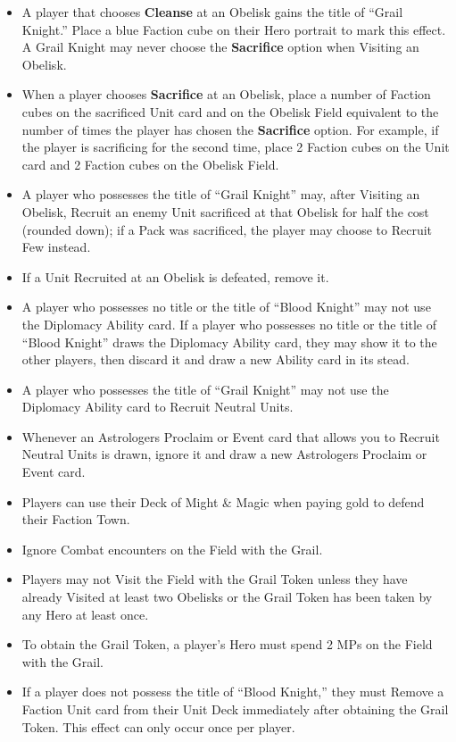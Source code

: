 \begin{multicols*}{2}
\begin{itemize}
  \item A player that chooses \textbf{Cleanse} at an Obelisk gains the title of ``\textcolor{cobalt}{Grail Knight}.'' Place a blue Faction cube on their Hero portrait to mark this effect. A \textcolor{cobalt}{Grail Knight} may never choose the \textbf{Sacrifice} option when Visiting an Obelisk.
  \item When a player chooses \textbf{Sacrifice} at an Obelisk, place a number of Faction cubes on the sacrificed Unit card and on the Obelisk Field equivalent to the number of times the player has chosen the \textbf{Sacrifice} option. For example, if the player is sacrificing for the second time, place 2 Faction cubes on the Unit card and 2 Faction cubes on the Obelisk Field.
  \item A player who possesses the title of ``\textcolor{cobalt}{Grail Knight}'' may, after Visiting an Obelisk, Recruit an enemy Unit sacrificed at that Obelisk for half the cost (rounded down); if a Pack was sacrificed, the player may choose to Recruit Few instead.
  \item If a Unit Recruited at an Obelisk is defeated, remove it.
  \item A player who possesses no title or the title of ``\textcolor{darkcandyapplered}{Blood Knight}'' may not use the Diplomacy Ability card. If a player who possesses no title or the title of ``\textcolor{darkcandyapplered}{Blood Knight}'' draws the Diplomacy Ability card, they may show it to the other players, then discard it and draw a new Ability card in its stead.
  \item A player who possesses the title of ``\textcolor{cobalt}{Grail Knight}'' may not use the Diplomacy Ability card to Recruit Neutral  Units.
  \item Whenever an Astrologers Proclaim or Event card that allows you to Recruit Neutral Units is drawn, ignore it and draw a new Astrologers Proclaim or Event card.
  \item Players can use their Deck of Might \& Magic when paying gold to defend their Faction Town.
  \item Ignore Combat encounters on the Field with the Grail.
  \item Players may not Visit the Field with the Grail Token unless they have already Visited at least two Obelisks or the Grail Token has been taken by any Hero at least once.
  \item To obtain the Grail Token, a player’s Hero must spend 2 MPs on the Field with the Grail.
  \item If a player does not possess the title of ``\textcolor{darkcandyapplered}{Blood Knight},'' they must Remove a Faction Unit card from their Unit Deck immediately after obtaining the Grail Token. This effect can only occur once per player.

\end{itemize}
\end{multicols*}
